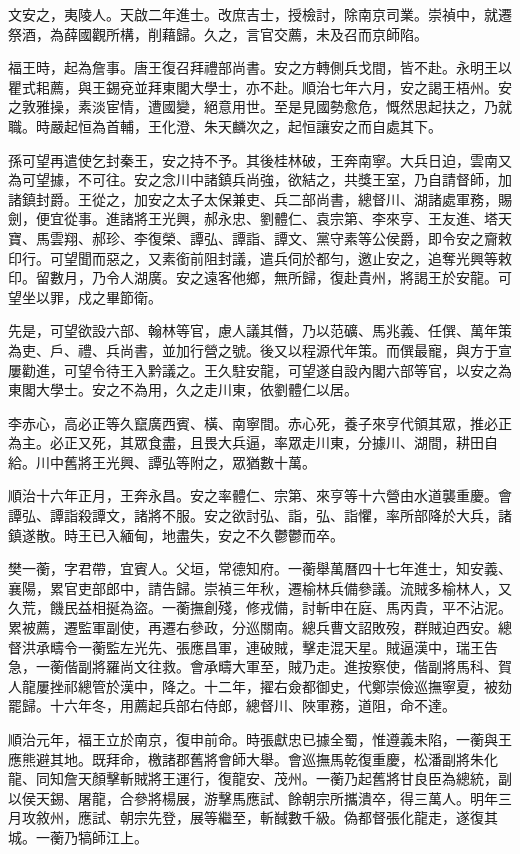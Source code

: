 \begin{pinyinscope}
文安之，夷陵人。天啟二年進士。改庶吉士，授檢討，除南京司業。崇禎中，就遷祭酒，為薛國觀所構，削藉歸。久之，言官交薦，未及召而京師陷。

福王時，起為詹事。唐王復召拜禮部尚書。安之方轉側兵戈間，皆不赴。永明王以瞿式耜薦，與王錫兗並拜東閣大學士，亦不赴。順治七年六月，安之謁王梧州。安之敦雅操，素淡宦情，遭國變，絕意用世。至是見國勢愈危，慨然思起扶之，乃就職。時嚴起恒為首輔，王化澄、朱天麟次之，起恒讓安之而自處其下。

孫可望再遣使乞封秦王，安之持不予。其後桂林破，王奔南寧。大兵日迫，雲南又為可望據，不可往。安之念川中諸鎮兵尚強，欲結之，共獎王室，乃自請督師，加諸鎮封爵。王從之，加安之太子太保兼吏、兵二部尚書，總督川、湖諸處軍務，賜劍，便宜從事。進諸將王光興，郝永忠、劉體仁、袁宗第、李來亨、王友進、塔天寶、馬雲翔、郝珍、李復榮、譚弘、譚詣、譚文、黨守素等公侯爵，即令安之齎敕印行。可望聞而惡之，又素銜前阻封議，遣兵伺於都勻，邀止安之，追奪光興等敕印。留數月，乃令人湖廣。安之遠客他鄉，無所歸，復赴貴州，將謁王於安龍。可望坐以罪，戍之畢節衛。

先是，可望欲設六部、翰林等官，慮人議其僭，乃以范礦、馬兆義、任僎、萬年策為吏、戶、禮、兵尚書，並加行營之號。後又以程源代年策。而僎最寵，與方于宣屢勸進，可望令待王入黔議之。王久駐安龍，可望遂自設內閣六部等官，以安之為東閣大學士。安之不為用，久之走川東，依劉體仁以居。

李赤心，高必正等久竄廣西賓、橫、南寧間。赤心死，養子來亨代領其眾，推必正為主。必正又死，其眾食盡，且畏大兵逼，率眾走川東，分據川、湖間，耕田自給。川中舊將王光興、譚弘等附之，眾猶數十萬。

順治十六年正月，王奔永昌。安之率體仁、宗第、來亨等十六營由水道襲重慶。會譚弘、譚詣殺譚文，諸將不服。安之欲討弘、詣，弘、詣懼，率所部降於大兵，諸鎮遂散。時王已入緬甸，地盡失，安之不久鬱鬱而卒。

樊一蘅，字君帶，宜賓人。父垣，常德知府。一蘅舉萬曆四十七年進士，知安義、襄陽，累官吏部郎中，請告歸。崇禎三年秋，遷榆林兵備參議。流賊多榆林人，又久荒，饑民益相挻為盜。一蘅撫創殘，修戎備，討斬申在庭、馬丙貴，平不沾泥。累被薦，遷監軍副使，再遷右參政，分巡關南。總兵曹文詔敗歿，群賊迫西安。總督洪承疇令一蘅監左光先、張應昌軍，連破賊，擊走混天星。賊逼漢中，瑞王告急，一蘅偕副將羅尚文往救。會承疇大軍至，賊乃走。進按察使，偕副將馬科、賀人龍屢挫祁總管於漢中，降之。十二年，擢右僉都御史，代鄭崇儉巡撫寧夏，被劾罷歸。十六年冬，用薦起兵部右侍郎，總督川、陜軍務，道阻，命不達。

順治元年，福王立於南京，復申前命。時張獻忠已據全蜀，惟遵義未陷，一蘅與王應熊避其地。既拜命，檄諸郡舊將會師大舉。會巡撫馬乾復重慶，松潘副將朱化龍、同知詹天顏擊斬賊將王運行，復龍安、茂州。一蘅乃起舊將甘良臣為總統，副以侯天錫、屠龍，合參將楊展，游擊馬應試、餘朝宗所攜潰卒，得三萬人。明年三月攻敘州，應試、朝宗先登，展等繼至，斬馘數千級。偽都督張化龍走，遂復其城。一蘅乃犒師江上。


\end{pinyinscope}
